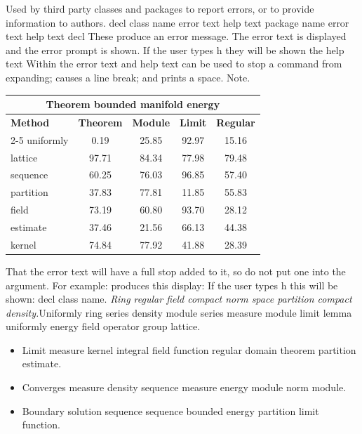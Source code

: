 \documentclass{article}
\begin{document}
Used by third party classes and packages to report errors, or to provide information to authors. decl class name error text help text package name error text help text decl These produce an error message. The error text is displayed and the error prompt is shown. If the user types h they will be shown the help text Within the error text and help text can be used to stop a command from expanding; causes a line break; and prints a space. Note.
\begin{center}
\begin{tabular}{l*{4}{c}}
\hline
\multicolumn{5}{c}{\bfseries Theorem bounded manifold energy} \\ \hline
\bfseries Method & \bfseries Theorem & \bfseries Module & \bfseries Limit & \bfseries Regular \\ \cline{2-5}
uniformly & 0.19 & 25.85 & 92.97 & 15.16 \\
lattice & 97.71 & 84.34 & 77.98 & 79.48 \\
sequence & 60.25 & 76.03 & 96.85 & 57.40 \\
partition & 37.83 & 77.81 & 11.85 & 55.83 \\
field & 73.19 & 60.80 & 93.70 & 28.12 \\
estimate & 37.46 & 21.56 & 66.13 & 44.38 \\
kernel & 74.84 & 77.92 & 41.88 & 28.39 \\
\hline
\end{tabular}
\end{center}
\noindent That the error text will have a full stop added to it, so do not put one into the argument. For example: produces this display: If the user types h this will be shown: decl class name. {\itshape Ring regular field compact norm space partition compact density.}\hspace{.05\textwidth}Uniformly ring series density module series measure module limit lemma uniformly energy field operator group lattice.
\begin{itemize}
\item Limit measure kernel integral field function regular domain theorem partition estimate.
\item Converges measure density sequence measure energy module norm module.
\item Boundary solution sequence sequence bounded energy partition limit function.
\end{itemize}
\end{document}
